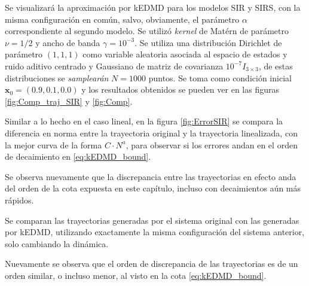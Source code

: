 Se visualizará la aproximación por kEDMD para los modelos SIR y SIRS, con la misma configuración en común, salvo, obviamente, el parámetro $\alpha$ correspondiente al segundo modelo. Se utilizó \textit{kernel} de Matérn de parámetro $\nu=1/2$ y ancho de banda $\gamma=10^{-3}$. Se utiliza una distribución Dirichlet de parámetro $(1,1,1)$ como variable aleatoria asociada al espacio de estados y ruido aditivo centrado y Gaussiano de matriz de covarianza $10^{-7} I_{3 \times 3}$, de estas distribuciones se \textit{samplearán} $N=1000$ puntos. Se toma como condición inicial $\mathbf{x}_0 = (0.9, 0.1, 0.0)$ y los resultados obtenidos se pueden ver en las figuras \ref{fig:Comp_traj_SIR} y \ref{fig:Comp}. 

Similar a lo hecho en el caso lineal, en la figura \ref{fig:ErrorSIR} se compara la diferencia en norma entre la trayectoria original y la trayectoria linealizada, con la mejor curva de la forma $C \cdot N^{a}$, para observar si los errores andan en el orden de decaimiento en \eqref{eq:kEDMD_bound}.

Se observa nuevamente que la discrepancia entre las trayectorias en efecto anda del orden de la cota expuesta en este capítulo, incluso con decaimientos aún más rápidos.

Se comparan las trayectorias generadas por el sistema original con las generadas por kEDMD, utilizando exactamente la misma configuración del sistema anterior, solo cambiando la dinámica.

Nuevamente se observa que el orden de discrepancia de las trayectorias es de un orden similar, o incluso menor, al visto en la cota \ref{eq:kEDMD_bound}.